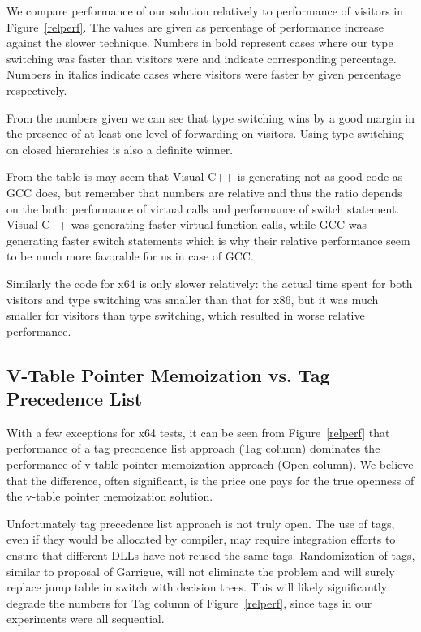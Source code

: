 We compare performance of our solution relatively to performance of visitors in 
Figure~\ref{relperf}. The values are given as percentage of performance increase 
against the slower technique. Numbers in bold represent cases where our type 
switching was faster than visitors were and indicate corresponding percentage. 
Numbers in italics indicate cases where visitors were faster by given percentage
respectively.

From the numbers given we can see that type switching wins by a good margin in 
the presence of at least one level of forwarding on visitors. Using type 
switching on closed hierarchies is also a definite winner.

From the table is may seem that Visual C++ is generating not as good code as GCC 
does, but remember that numbers are relative and thus the ratio depends on the 
both: performance of virtual calls and performance of switch statement. Visual 
C++ was generating faster virtual function calls, while GCC was generating 
faster switch statements which is why their relative performance seem to be much 
more favorable for us in case of GCC.

Similarly the code for x64 is only slower relatively: the actual time spent for 
both visitors and type switching was smaller than that for x86, but it was much 
smaller for visitors than type switching, which resulted in worse relative 
performance.

\subsection{V-Table Pointer Memoization vs. Tag Precedence List}
\label{sec:cmp}

With a few exceptions for x64 tests, it can be seen from Figure~\ref{relperf} 
that performance of a tag precedence list approach (Tag column) dominates the 
performance of v-table pointer memoization approach (Open column). We believe 
that the difference, often significant, is the price one pays for the true 
openness of the v-table pointer memoization solution.

Unfortunately tag precedence list approach is not truly open. The use of tags, 
even if they would be allocated by compiler, may require integration efforts to 
ensure that different DLLs have not reused the same tags. Randomization of tags,
similar to proposal of Garrigue\cite{garrigue-98}, will not eliminate the 
problem and will surely replace jump table in switch with decision trees. This 
will likely significantly degrade the numbers for Tag column of 
Figure~\ref{relperf}, since tags in our experiments were all sequential.

